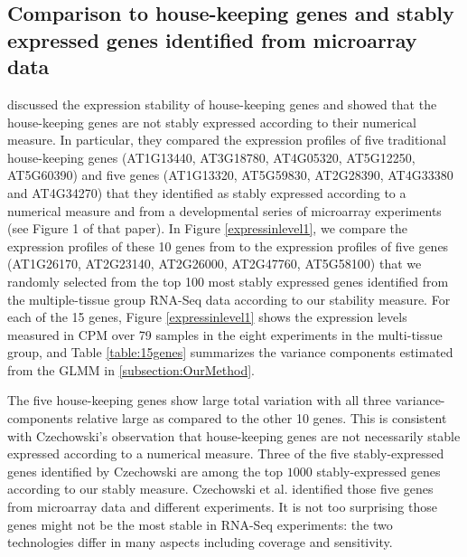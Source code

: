 \documentclass[11pt, a4paper]{article}
\begin{document}
\subsection{Comparison to house-keeping genes and stably expressed genes
identified from microarray data}\label{section:CompareStablyExpressedGene}
\cite{czechowski2005genome} discussed the expression stability of
house-keeping genes and showed that the house-keeping genes are not stably
expressed according to their numerical measure. In particular, they compared
the expression profiles of five traditional house-keeping genes (AT1G13440,
AT3G18780, AT4G05320, AT5G12250, AT5G60390) and five genes (AT1G13320,
AT5G59830, AT2G28390, AT4G33380 and AT4G34270) that they identified  as stably
expressed according to a numerical measure and from a developmental series of
microarray experiments (see Figure 1 of that paper).  
In Figure \ref{expressinlevel1}, we compare the expression profiles 
of these 10 genes from \cite{czechowski2005genome} to the expression profiles
of five genes (AT1G26170, AT2G23140, AT2G26000, AT2G47760, AT5G58100) that we
randomly selected from the top 100 most stably expressed genes identified from
the multiple-tissue group RNA-Seq data according to our stability measure.
For each of the 15 genes, Figure \ref{expressinlevel1} shows the expression levels measured
in CPM over 79 samples in the eight experiments in the multi-tissue group,
and Table \ref{table:15genes} summarizes the variance components estimated from the
GLMM in \ref{subsection:OurMethod}. 

The five house-keeping genes show large total variation with all three
variance-components relative large as compared to the other 10 genes. This is
consistent with Czechowski's observation that house-keeping genes are not necessarily stable
expressed according to a numerical measure.  Three of the five
stably-expressed genes identified by Czechowski are among the top $1000$
stably-expressed genes according to our stably measure. Czechowski et al.
identified those five genes from microarray data and different experiments. It
is not too surprising those genes might not be the most stable in RNA-Seq
experiments: the two technologies differ in many aspects including coverage
and sensitivity. 
\end{document}
